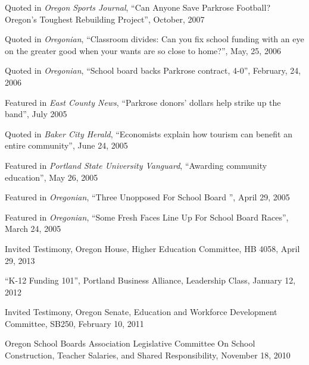 \documentclass[Computer Science]{vita}
\begin{document}
\begin{vita}
\begin{Media Outreach}
  \item Quoted in \emph{Oregon Sports Journal}, ``Can Anyone Save
    Parkrose Football?  Oregon's Toughest Rebuilding Project'',
    October, 2007

  \item Quoted in \emph{Oregonian}, ``Classroom divides: Can you fix
    school funding with an eye on the greater good when your wants are
    so close to home?'', May, 25, 2006

  \item Quoted in \emph{Oregonian}, ``School board backs Parkrose
    contract, 4-0'', February, 24, 2006

  \item Featured in \emph{East County News}, ``Parkrose donors'
    dollars help strike up the band'', July 2005

  \item Quoted in \emph{Baker City Herald}, ``Economists explain how
    tourism can benefit an entire community'', June 24, 2005
	
  \item Featured in \emph{Portland State University Vanguard},
    ``Awarding community education'', May 26, 2005
	
  \item Featured in \emph{Oregonian}, ``Three Unopposed For School
    Board '', April 29, 2005
	
  \item Featured in \emph{Oregonian}, ``Some Fresh Faces Line Up For
    School Board Races'', March 24, 2005

  \end{Media Outreach}

  \begin{Community Outreach}
  
  \item Invited Testimony, Oregon House, Higher Education Committee, HB 4058, April 29, 2013

\item ``K-12 Funding 101'', Portland Business Alliance, Leadership Class, January 12, 2012

\item Invited Testimony, Oregon Senate, Education and Workforce Development Committee, SB250, February 10, 2011 
  
\item Oregon School Boards Association Legislative Committee On School Construction, Teacher Salaries, and Shared Responsibility, November 18, 2010   


\end{Community Outreach}
\end{vita}
\end{document}
